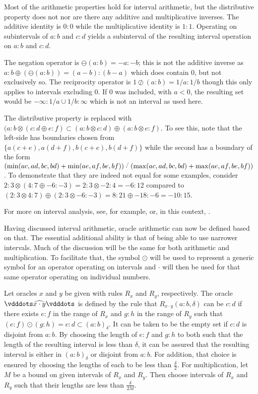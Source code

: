 \documentclass[12pt]{article}
\begin{document}
Most of the arithmetic properties hold for interval arithmetic, but the distributive property does not nor are there any additive and multiplicative inverses. The additive identity is $0:0$ while the multiplicative identity is $1:1$. Operating on subintervals of $a:b$ and $c:d$ yields a subinterval of the resulting interval operation on $a:b$ and $c:d$. 

The negation operator is $\ominus(a:b) = -a:-b$; this is not the additive inverse as $a:b \oplus (\ominus(a :b )) = (a-b):(b-a)$ which does contain 0, but not exclusively so. The reciprocity operator is $1 \oslash (a:b) = 1/a : 1/b$ though this only applies to intervals excluding 0. If 0 was included, with $a < 0$, the resulting set would be $-\infty:1/a \cup 1/b : \infty $ which is not an interval as used here.

The distributive property is replaced with $( a:b \otimes ( c:d \oplus e:f) \subset (a:b \otimes c:d) \oplus (a:b \otimes e:f)$. To see this, note that the left-side has boundaries chosen from $\{a(c+e), a(d+f), b(c+e), b(d+f)\}$ while the second has a boundary of the form $(\min(ac, ad, bc, bd) + \min(ae, af, be, bf) ) \lte (\max(ac, ad, bc, bd) + \max(ae, af, be, bf) )$. To demonstrate that they are indeed not equal for some examples, consider $2:3 \otimes ( 4:7 \oplus -6:-3) = 2:3 \otimes -2:4 = -6:12$ compared to $(2:3 \otimes 4:7) \oplus (2:3 \otimes -6:-3) = 8:21 \oplus -18:-6 = -10:15$. 

For more on interval analysis, see, for example, \cite{moore} or, in this context, \cite{taylor23main}.

Having discussed interval arithmetic, oracle arithmetic can now be defined based on that. The essential additional ability is that of being able to use narrower intervals. Much of the discussion will be the same for both arithmetic and multiplication. To facilitate that, the symbol $\odot$ will be used to represent a generic symbol for an operator operating on intervals and $\cdot$ will then be used for that same operator operating on individual numbers.

Let oracles $x$ and $y$ be given with rules $R_x$ and $R_y$, respectively. The oracle $\xora[x \cdot y]$ is defined by the rule that $R_{x \cdot y}(a:b, \delta)$ can be $c:d$ if there exists $e:f$ in the range of $R_x$ and $g:h$ in the range of $R_y$ such that $(e:f) \odot (g:h) = c:d \subset (a:b)_\delta$. It can be taken to be the empty set if $c:d$ is disjoint from $a:b$. By choosing the length of $e:f$ and $g:h$ to both such that the length of the resulting interval is less than $\delta$, it can be assured that the resulting interval is either in $(a:b)_\delta$ or disjoint from $a:b$. For addition, that choice is ensured by choosing the lengths of each to be less than $\frac{\delta}{2}$. For multiplication, let $M$ be a bound on given intervals of $R_x$ and $R_y$. Then choose intervals of $R_x$ and $R_y$ such that their lengths are less than $\frac{\delta}{2M}$. 
\end{document}
